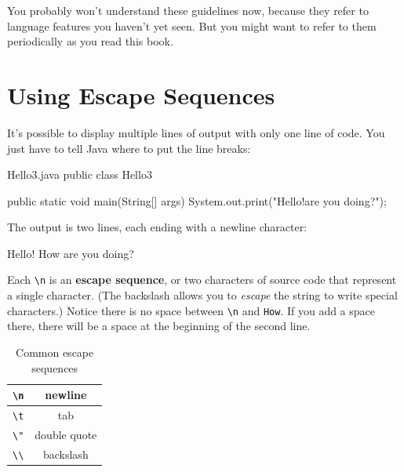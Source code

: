 You probably won't understand these guidelines now, because they refer to language features you haven't yet seen.
But you might want to refer to them periodically as you read this book.



\section{Using Escape Sequences}

It's possible to display multiple lines of output with only one line of code.
You just have to tell Java where to put the line breaks:

\begin{trinket}[220]{Hello3.java}
public class Hello3 {

    public static void main(String[] args) {
        System.out.print("Hello!\nHow are you doing?\n");
    }
}
\end{trinket}

The output is two lines, each ending with a newline character:

\begin{stdout}
Hello!
How are you doing?
\end{stdout}


Each \verb"\n" is an {\bf escape sequence}, or two characters of source code that represent a single character.
(The backslash allows you to {\em escape} the string to write special characters.)
Notice there is no space between \verb"\n" and \verb"How".
If you add a space there, there will be a space at the beginning of the second line.

\begin{table}[!ht]
\begin{center}
\begin{tabular}{|c|c|}
\hline
\verb"\n" & newline \\
\hline
\verb"\t" & tab \\
\hline
\verb'\"' & double quote \\
\hline
\verb"\\" & backslash \\
\hline
\end{tabular}
\caption{Common escape sequences}
\label{tab:escape}
\end{center}
\end{table}

